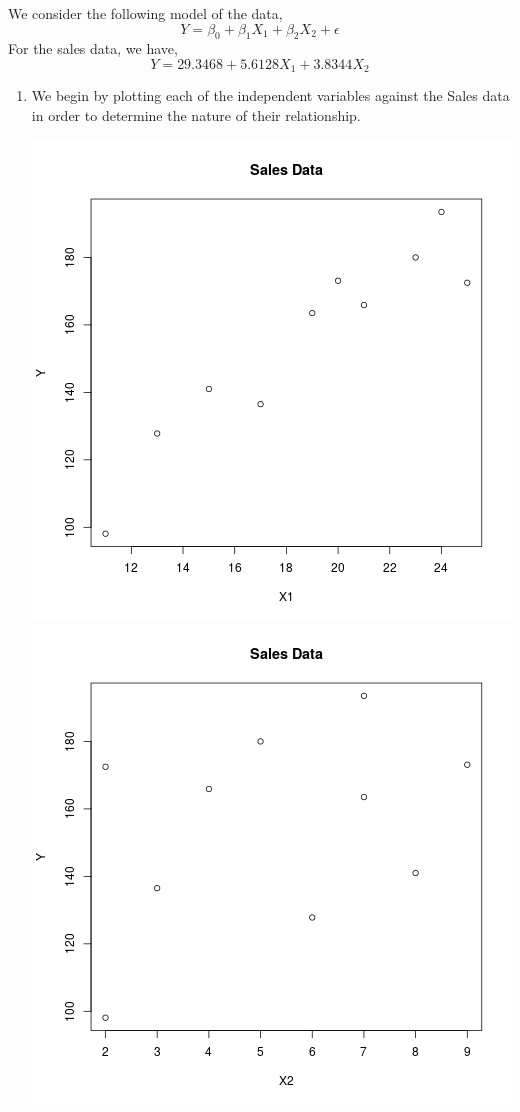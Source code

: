 \documentclass[letterpaper,10pt]{article}
\begin{document}
We consider the following model of the data,
\[Y=\beta_0+\beta_1X_1+\beta_2X_2+\epsilon\]
For the sales data, we have,
\[Y=29.3468+5.6128X_1+3.8344X_2\]
\begin{enumerate}
\item We begin by plotting each of the independent variables against the Sales data in order to determine the nature of their relationship.\\
\begin{center}
\includegraphics[scale=.5]{yx1.png}
\includegraphics[scale=.5]{yx2.png}

\end{center}
\end{enumerate}
\end{document}
